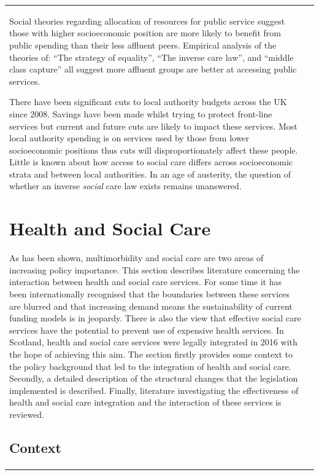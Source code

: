 \documentclass[12pt,a4paper,oneside,table]{report}
\begin{document}
\begin{tabular}[t]{ll}
Social theories regarding allocation of resources for public service
suggest those with higher socioeconomic position are more likely to
benefit from public spending than their less affluent peers. Empirical
analysis of the theories of: ``The strategy of equality'', ``The inverse
care law'', and ``middle class capture'' all suggest more affluent
groups are better at accessing public services.

There have been significant cuts to local authority budgets across the
UK since 2008. Savings have been made whilst trying to protect
front-line services but current and future cuts are likely to impact
these services. Most local authority spending is on services used by
those from lower socioeconomic positions thus cuts will
disproportionately affect these people. Little is known about how access
to social care differs across socioeconomic strata and between local
authorities. In an age of austerity, the question of whether an inverse
\textit{social} care law exists remains unanswered.

\newpage

\section{Health and Social Care}\label{sec:hsc-interaction}

As has been shown, multimorbidity and social care are two areas of
increasing policy importance. This section describes literature
concerning the interaction between health and social care services. For
some time it has been internationally recognised that the boundaries
between these services are blurred and that increasing demand means the
sustainability of current funding models is in jeopardy. There is also
the view that effective social care services have the potential to
prevent use of expensive health services. In Scotland, health and social
care services were legally integrated in 2016 with the hope of achieving
this aim. The section firstly provides some context to the policy
background that led to the integration of health and social care.
Secondly, a detailed description of the structural changes that the
legislation implemented is described. Finally, literature investigating
the effectiveness of health and social care integration and the
interaction of these services is reviewed.

\subsection{Context}\label{subsec:policy}


\end{tabular}
\end{document}
